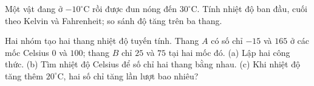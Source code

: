 \begin{bt}
Một vật đang ở $-10^\circ\mathrm{C}$ rồi được đun nóng đến $30^\circ\mathrm{C}$. Tính nhiệt độ ban đầu, cuối theo Kelvin và Fahrenheit; so sánh độ tăng trên ba thang.
\end{bt}

\begin{bt}
Hai nhóm tạo hai thang nhiệt độ tuyến tính. Thang $A$ có số chỉ $-15$ và $165$ ở các mốc Celsius $0$ và $100$; thang $B$ chỉ $25$ và $75$ tại hai mốc đó. (a) Lập hai công thức. (b) Tìm nhiệt độ Celsius để số chỉ hai thang bằng nhau. (c) Khi nhiệt độ tăng thêm $20^\circ\mathrm{C}$, hai số chỉ tăng lần lượt bao nhiêu?
\end{bt}
